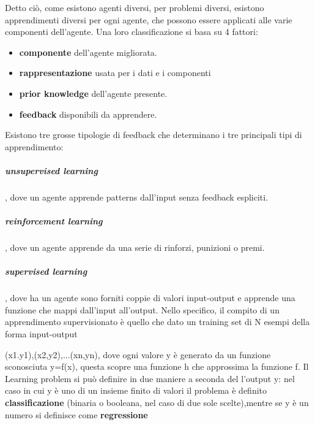 \documentclass[14pt]{extarticle}
\begin{document}
Detto ciò, come esistono agenti diversi, per problemi diversi, esistono apprendimenti diversi per ogni agente, che possono essere applicati alle varie componenti dell'agente.
Una loro classificazione si basa su 4 fattori:
\begin{itemize}
\item \textbf{componente} dell'agente migliorata.
\item \textbf{rappresentazione} usata per i dati e i componenti
\item \textbf{prior knowledge} dell'agente presente.
\item \textbf{feedback}  disponibili da apprendere. 
\end{itemize} 

Esistono tre grosse tipologie di feedback che determinano i tre principali tipi di apprendimento:
\subparagraph{unsupervised learning}, dove un agente apprende patterns dall'input senza feedback espliciti. 

\subparagraph{reinforcement learning}, dove un agente apprende da una serie di rinforzi, punizioni o premi.
\subparagraph{supervised learning}, dove ha un agente sono forniti coppie di valori input-output e apprende una funzione che mappi dall'input all'output. 
Nello specifico, il compito di un apprendimento supervisionato è quello che dato un training set di N esempi della forma input-output

(x1.y1),(x2,y2),...(xn,yn),
dove ogni valore y è generato da un funzione sconosciuta y=f(x), questa scopre una funzione h che approssima la funzione f.  
Il Learning problem si può definire in due maniere a seconda del l'output y: nel caso in cui  y è uno di  un insieme finito di valori il problema è definito  \textbf{classificazione} (binaria o booleana, nel caso di due sole scelte),mentre se y è un numero
 si definisce come \textbf{regressione}
\end{document}
